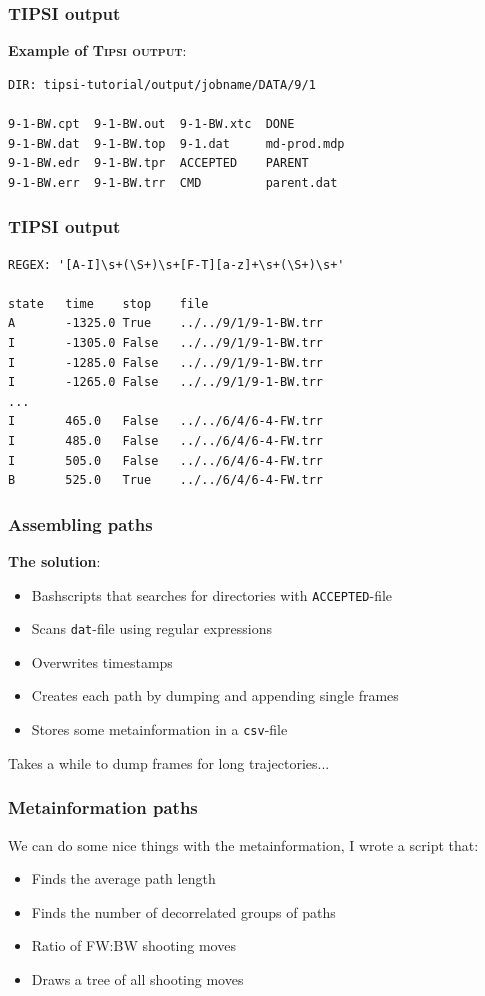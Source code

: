 \documentclass[hyperref={pdfpagelabels=false}]{beamer}
\begin{document}
\begin{frame}[fragile]
\frametitle{\textsc{TIPSI} output}
\textbf{Example of \textsc{Tipsi output}}:
\begin{lstlisting}
DIR: tipsi-tutorial/output/jobname/DATA/9/1

9-1-BW.cpt  9-1-BW.out  9-1-BW.xtc  DONE
9-1-BW.dat  9-1-BW.top  9-1.dat     md-prod.mdp
9-1-BW.edr  9-1-BW.tpr  ACCEPTED    PARENT
9-1-BW.err  9-1-BW.trr  CMD         parent.dat
\end{lstlisting}
\end{frame}

\begin{frame}[fragile]
\frametitle{\textsc{TIPSI} output}
\begin{lstlisting}
REGEX: '[A-I]\s+(\S+)\s+[F-T][a-z]+\s+(\S+)\s+'

state   time    stop    file
A       -1325.0 True    ../../9/1/9-1-BW.trr
I       -1305.0 False   ../../9/1/9-1-BW.trr
I       -1285.0 False   ../../9/1/9-1-BW.trr
I       -1265.0 False   ../../9/1/9-1-BW.trr
...
I       465.0   False   ../../6/4/6-4-FW.trr
I       485.0   False   ../../6/4/6-4-FW.trr
I       505.0   False   ../../6/4/6-4-FW.trr
B       525.0   True    ../../6/4/6-4-FW.trr
\end{lstlisting}
\end{frame}

\begin{frame}
\frametitle{Assembling paths}
\textbf{The solution}: 
\begin{itemize}
\item Bashscripts that searches for directories with \texttt{ACCEPTED}-file
\item Scans \texttt{dat}-file using regular expressions
\item Overwrites timestamps
\item Creates each path by dumping and appending single frames
\item Stores some metainformation in a \texttt{csv}-file
\end{itemize}
Takes a while to dump frames for long trajectories...
\end{frame}

\begin{frame}
\frametitle{Metainformation paths} 
We can do some nice things with the metainformation, I wrote a script that:
\begin{itemize}
\item Finds the average path length
\item Finds the number of decorrelated groups of paths
\item Ratio of FW:BW shooting moves
\item Draws a tree of all shooting moves
\end{itemize}
\end{frame}
\end{document}

